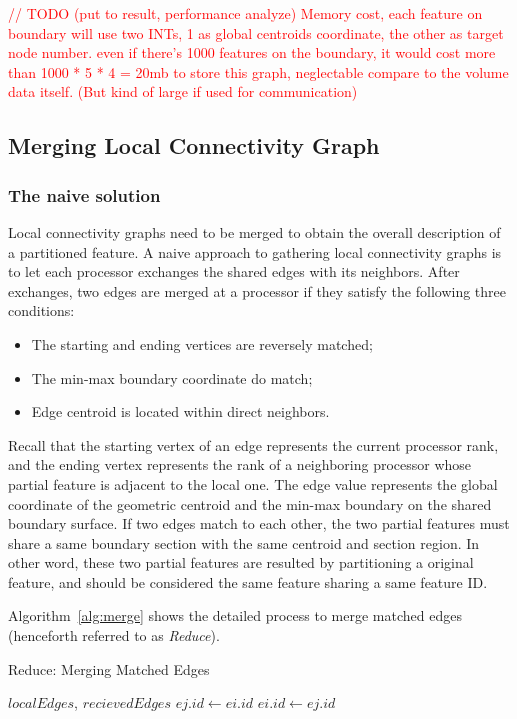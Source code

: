 \documentclass[10pt, conference, compsocconf]{IEEEtran}
\begin{document}
\textcolor{red}{
// TODO (put to result, performance analyze)
Memory cost, each feature on boundary will use two INTs, 1 as global centroids coordinate, the other as target node number. even if there's 1000 features on the boundary, it would cost more than 1000 * 5 * 4 = 20mb to store this graph, neglectable compare to the volume data itself. (But kind of large if used for communication)
}

\subsection{Merging Local Connectivity Graph}

\subsubsection{The naive solution}

Local connectivity graphs need to be merged to obtain the overall description of a partitioned feature. A naive approach to gathering local connectivity graphs is to let each processor exchanges the shared edges with its neighbors. After exchanges, two edges are merged at a processor if they satisfy the following three conditions:

\begin{itemize}
\item The starting and ending vertices are reversely matched;
\item The min-max boundary coordinate do match;
\item Edge centroid is located within direct neighbors.
\end{itemize}

Recall that the starting vertex of an edge represents the current processor rank, and the ending vertex represents the rank of a neighboring processor whose partial feature is adjacent to the local one. The edge value represents the global coordinate of the geometric centroid and the min-max boundary on the shared boundary surface. If two edges match to each other, the two partial features must share a same boundary section with the same centroid and section region. In other word, these two partial features are resulted by partitioning a original feature, and should be considered the same feature sharing a same feature ID.

Algorithm~\ref{alg:merge} shows the detailed process to merge matched edges (henceforth referred to as \emph{Reduce}).
\begin{algorithm}
\caption{Reduce: Merging Matched Edges}
\label{alg:merge}
\begin{algorithmic}[1]
\REQUIRE $localEdges$, $recievedEdges$
				\STATE $ej.id \leftarrow ei.id$
			\ELSE
				\STATE $ei.id \leftarrow ej.id$
			\ENDIF
		\ENDIF
	\ENDFOR	
\ENDFOR	
\end{algorithmic}
\end{algorithm}
\end{document}
